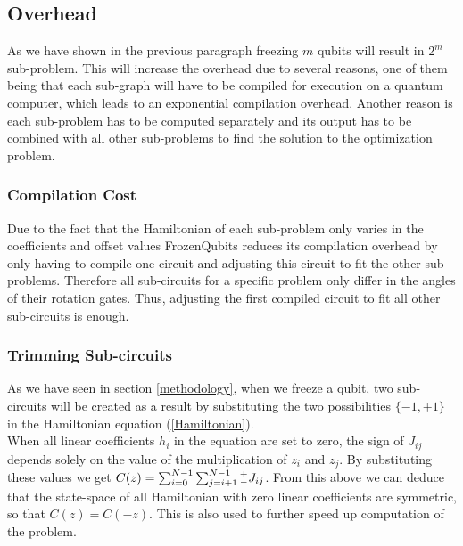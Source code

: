 \subsection{Overhead}\label{overhead}
As we have shown in the previous paragraph freezing $m$ qubits will result in $2^m$ sub-problem. This will increase the overhead due to several reasons, one of them being that each sub-graph will have to be compiled for execution on a quantum computer, which  leads to an exponential compilation overhead. Another reason is each sub-problem has to be computed separately and its output has to be combined with all other sub-problems to find the solution to the optimization problem.
\subsubsection{Compilation Cost}\label{cost}
Due to the fact that the Hamiltonian of each sub-problem only varies in the coefficients and offset values FrozenQubits reduces its compilation overhead by only having to compile one circuit and adjusting this circuit to fit the other sub-problems. Therefore all sub-circuits for a specific problem only differ in the angles of their rotation gates. Thus, adjusting the first compiled circuit to fit all other sub-circuits is enough.
\subsubsection{Trimming Sub-circuits}
As we have seen in section \ref{methodology}, when we freeze a qubit, two sub-circuits will be created as a result by substituting the two possibilities $\{-1, +1\}$ in the Hamiltonian equation (\ref{Hamiltonian}).\\
When all linear coefficients $h_i$ in the equation are set to zero, the sign of $J_{ij}$ depends solely on the value of the multiplication of $z_i$ and $z_j$. By substituting these values we get $C(z) = \sum^{N-1}_{i=0}\sum^{N-1}_{j=i+1}\smash{{}^+_-}J_{ij}$.
From this above we can deduce that the state-space of all Hamiltonian with zero linear coefficients are symmetric, so that $C(z) = C(-z)$. This is also used to further speed up computation of the problem.
